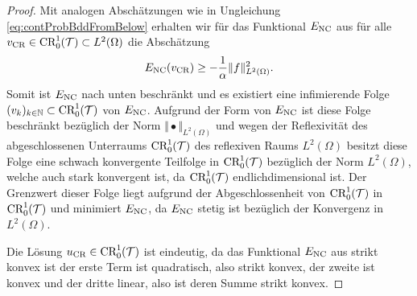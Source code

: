 \begin{proof}
  Mit analogen Abschätzungen wie in Ungleichung \eqref{eq:contProbBddFromBelow}
  erhalten wir für das Funktional $E_\textup{NC}$ aus  
  für alle $v_\textup{CR}\in\textup{CR}^1_0(\mathcal{T})\subset L^2(\Omega)$ die Abschätzung 
  \begin{equation*}
    E_\textup{NC}(v_\textup{CR}) \geq -\frac{1}{\alpha}\Vert f\Vert_{L^2(\Omega)}^2.
  \end{equation*}
  Somit ist $E_\textup{NC}$ nach unten beschränkt und es existiert eine infimierende
  Folge $(v_k)_{k\in\mathbb{N}} \subset \textup{CR}^1_0(\mathcal{T})$ von $E_\textup{NC}$. Aufgrund der
  Form von $E_\textup{NC}$ ist diese Folge beschränkt bezüglich der Norm
  $\Vert\bullet\Vert_{L^2(\Omega)}$ und wegen der  Reflexivität des
  abgeschlossenen Unterraums $\textup{CR}^1_0(\mathcal{T})$ des reflexiven
  Raums $L^2(\Omega)$ besitzt diese Folge eine schwach konvergente 
  Teilfolge in $\textup{CR}^1_0(\mathcal{T})$
  bezüglich der Norm $L^2(\Omega)$, welche auch stark konvergent ist, da 
  $\textup{CR}^1_0(\mathcal{T})$ endlichdimensional ist. Der Grenzwert dieser Folge
  liegt aufgrund der Abgeschlossenheit von $\textup{CR}^1_0(\mathcal{T})$ in
  $\textup{CR}^1_0(\mathcal{T})$ und minimiert $E_\textup{NC}$, da 
  $E_\textup{NC}$ stetig ist bezüglich der Konvergenz in $L^2(\Omega)$.


  Die Lösung $u_\textup{CR}\in \textup{CR}^1_0(\mathcal{T})$ ist eindeutig, da das Funktional $E_\textup{NC}$
  aus  strikt konvex ist {\color{red} der erste
  Term ist quadratisch, also strikt konvex, der zweite ist konvex und der 
  dritte linear, also ist deren Summe strikt konvex}.


\end{proof}
